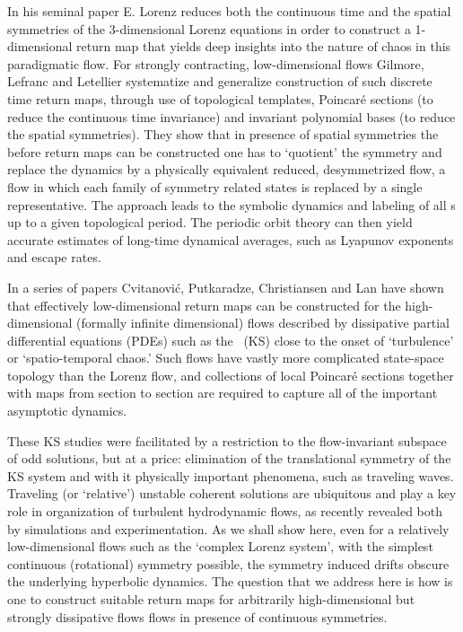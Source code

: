 %
In his seminal paper E. Lorenz reduces both the
continuous time and the spatial symmetries of the
3-dimensional Lorenz equations in order to construct a
1-dimensional return map that yields deep
insights into the nature of chaos in this
paradigmatic flow. For strongly contracting, low-dimensional
flows Gilmore, Lefranc and
Letellier systematize and
generalize construction of such discrete time return maps,
through use of topological templates, Poincar\'e sections (to
reduce the continuous time invariance) and invariant
polynomial bases (to reduce the spatial symmetries). They
show that in presence of spatial symmetries the before return
maps can be constructed one has to  `quotient' the symmetry
and replace the dynamics by a physically equivalent reduced,
desymmetrized flow, a flow in which each family of symmetry
related states is replaced by a single representative. The
approach leads to the symbolic dynamics and labeling of all \po
s up to a given topological period. The periodic orbit theory
can then yield accurate estimates of long-time dynamical
averages, such as Lyapunov exponents and escape
rates.

In a series of papers Cvitanovi\'{c}, Putkaradze,
Christiansen and Lan%
have shown that effectively low-dimensional return maps can
be constructed for the high-dimensional (formally infinite
dimensional)  flows described by dissipative partial differential
equations (PDEs) such as the \KSe\ (KS) close to the onset of
`turbulence' or `spatio-temporal chaos.' Such flows have
vastly more complicated state-space topology than the Lorenz
flow, and collections of local Poincar\'e sections together
with maps from section to section are required to capture all
of the important asymptotic dynamics.

These KS studies were facilitated by a restriction to the
flow-invariant subspace of odd solutions, but at a price:
elimination of the translational symmetry of the KS system
and with it physically important phenomena, such as traveling
waves. Traveling (or `relative') unstable coherent solutions
are ubiquitous and play a key role in organization of
turbulent hydrodynamic flows, as recently revealed both by
simulations and
experimentation. As we
shall show here, even for a relatively low-dimensional flows
such as the `complex Lorenz system', with the simplest
continuous (rotational) symmetry possible, the symmetry
induced drifts obscure the underlying hyperbolic dynamics.
The question that we address here is how is one to construct
suitable return maps for arbitrarily high-dimensional but
strongly dissipative flows flows in presence of continuous
symmetries.

